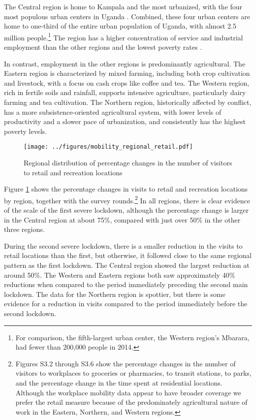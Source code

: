 \documentclass{wber}
\begin{document}
The Central region is home to Kampala and the most urbanized, with the
four most populous urban centers in Uganda
\citep{Uganda-Bureau-of-Statistics2016}. Combined, these four urban
centers are home to one-third of the entire urban population of Uganda,
with almost 2.5 million people.\footnote{For comparison, the
  fifth-largest urban center, the Western region's Mbarara, had fewer
  than 200,000 people in 2014.} The region has a higher concentration of
service and industrial employment than the other regions and the lowest
poverty rates \citep{Ssewanyana2012}.

In contrast, employment in the other regions is predominantly
agricultural. The Eastern region is characterized by mixed farming,
including both crop cultivation and livestock, with a focus on cash
crops like coffee and tea. The Western region, rich in fertile soils and
rainfall, supports intensive agriculture, particularly dairy farming and
tea cultivation. The Northern region, historically affected by conflict,
has a more subsistence-oriented agricultural system, with lower levels
of productivity and a slower pace of urbanization, and consistently has
the highest poverty levels.

\begin{figure}
\centering
\texttt{[image: ../figures/mobility\_regional\_retail.pdf]}
\caption{Regional distribution of percentage changes in the number of
visitors to retail and recreation locations}\label{fig:retail_regional}
\end{figure}

Figure \ref{fig:retail_regional} shows the percentage changes in visits to
retail and recreation locations by region, together with the survey
rounds.\footnote{Figures S3.2 through S3.6 show the
  percentage changes in the number of visitors to workplaces to
  groceries or pharmacies, to transit stations, to parks, and the
  percentage change in the time spent at residential locations. Although
  the workplace mobility data appear to have broader coverage we prefer
  the retail measure because of the predominately agricultural nature of
  work in the Eastern, Northern, and Western regions.} In all regions,
there is clear evidence of the scale of the first severe lockdown,
although the percentage change is larger in the Central region at about
75\%, compared with just over 50\% in the other three regions.

During the second severe lockdown, there is a smaller reduction in the
visits to retail locations than the first, but otherwise, it followed
close to the same regional pattern as the first lockdown. The Central
region showed the largest reduction at around 50\%. The Western and
Eastern regions both saw approximately 40\% reductions when compared to
the period immediately preceding the second main lockdown. The data for
the Northern region is spottier, but there is some evidence for a
reduction in visits compared to the period immediately before the second
lockdown.
\end{document}

